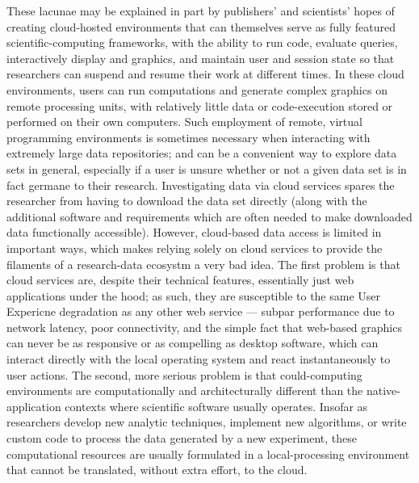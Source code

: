 \documentclass[11pt,letterpaper]{article}
\newcommand{\ThreeD}{\resizebox{!}{7pt}{\AcronymText{3D}}}
\newcommand{\TwoD}{\resizebox{!}{7pt}{\AcronymText{2D}}}
\newcommand{\textscc}[1]{{\color{orr!35!black}{{%
						\fontfamily{Cabin-TLF}\fontseries{b}\selectfont{\textsc{\scriptsize{#1}}}}}}}
\newcommand{\AcronymText}[1]{{\textscc{#1}}}
\newcommand{\p}[1]{

\vspace{1em}#1}
\begin{document}
{\p{These lacunae may be explained in part by publishers' 
and scientists' hopes of creating cloud-hosted 
environments that can themselves serve as fully featured 
scientific-computing frameworks, with the ability 
to run code, evaluate queries, interactively 
display \TwoD{} and \ThreeD{} graphics, and 
maintain user and session state so that 
researchers can suspend and resume their work 
at different times.  In these cloud environments, 
users can run computations and generate complex 
graphics on remote processing units, with relatively 
little data or code-execution stored or performed 
on their own computers.  Such employment of remote, 
virtual programming environments is sometimes necessary 
when interacting with extremely large data repositories; 
and can be a convenient way to explore data sets 
in general, especially if a user is unsure whether 
or not a given data set is in fact germane to 
their research.  Investigating data via cloud 
services spares the researcher from having to 
download the data set directly (along with 
the additional software and requirements which 
are often needed to make downloaded data functionally 
accessible).  However, cloud-based data access is 
limited in important ways, which makes relying 
solely on cloud services to provide the 
filaments of a research-data ecosystm a very bad 
idea.  The first problem is that cloud services 
are, despite their technical features, essentially 
just web applications under the hood; as such, 
they are susceptible to the same User Expericne 
degradation as any other web service --- subpar 
performance due to network latency, poor connectivity, 
and the simple fact that web-based graphics can 
never be as responsive or as compelling as 
desktop software, which can interact directly 
with the local operating system and react 
instantaneously to user actions.  The second, 
more serious problem is that could-computing 
environments are computationally and 
architecturally different than the native-application 
contexts where scientific software usually 
operates.  Insofar as researchers develop 
new analytic techniques, implement new algorithms, 
or write custom code to process the data 
generated by a new experiment, these 
computational resources are usually 
formulated in a local-processing environment that 
cannot be translated, without extra 
effort, to the cloud.}


}
\end{document}
